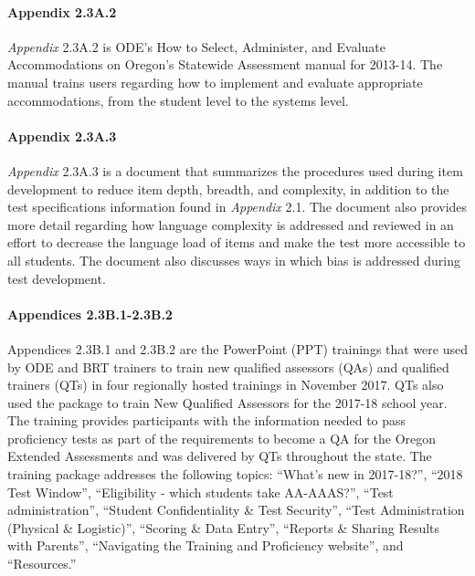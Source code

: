 \documentclass[]{article}
\let\oldparagraph\paragraph
\renewcommand{\paragraph}[1]{\oldparagraph{#1}\mbox{}}
\begin{document}
\hypertarget{appendix-2.3a.2}{%
\paragraph{Appendix 2.3A.2}\label{appendix-2.3a.2}}

\emph{Appendix} 2.3A.2 is ODE's How to Select, Administer, and Evaluate
Accommodations on Oregon's Statewide Assessment manual for 2013-14. The
manual trains users regarding how to implement and evaluate appropriate
accommodations, from the student level to the systems level.

\hypertarget{appendix-2.3a.3}{%
\paragraph{Appendix 2.3A.3}\label{appendix-2.3a.3}}

\emph{Appendix} 2.3A.3 is a document that summarizes the procedures used
during item development to reduce item depth, breadth, and complexity,
in addition to the test specifications information found in
\emph{Appendix} 2.1. The document also provides more detail regarding
how language complexity is addressed and reviewed in an effort to
decrease the language load of items and make the test more accessible to
all students. The document also discusses ways in which bias is
addressed during test development.

\hypertarget{appendices-2.3b.1-2.3b.2}{%
\paragraph{Appendices 2.3B.1-2.3B.2}\label{appendices-2.3b.1-2.3b.2}}

Appendices 2.3B.1 and 2.3B.2 are the PowerPoint (PPT) trainings that
were used by ODE and BRT trainers to train new qualified assessors (QAs)
and qualified trainers (QTs) in four regionally hosted trainings in
November 2017. QTs also used the package to train New Qualified
Assessors for the 2017-18 school year. The training provides
participants with the information needed to pass proficiency tests as
part of the requirements to become a QA for the Oregon Extended
Assessments and was delivered by QTs throughout the state. The training
package addresses the following topics: ``What's new in 2017-18?'',
``2018 Test Window'', ``Eligibility - which students take AA-AAAS?'',
``Test administration'', ``Student Confidentiality \& Test Security'',
``Test Administration (Physical \& Logistic)'', ``Scoring \& Data
Entry'', ``Reports \& Sharing Results with Parents'', ``Navigating the
Training and Proficiency website'', and ``Resources.''
\end{document}
